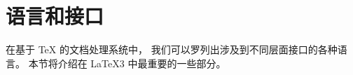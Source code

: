 \documentclass[full]{l3doc}
\begin{document}
\section{语言和接口}
%
%

在基于 \TeX{} 的文档处理系统中，
我们可以罗列出涉及到不同层面接口的各种语言。
本节将介绍在 \LaTeX3 中最重要的一些部分。

\end{document}
